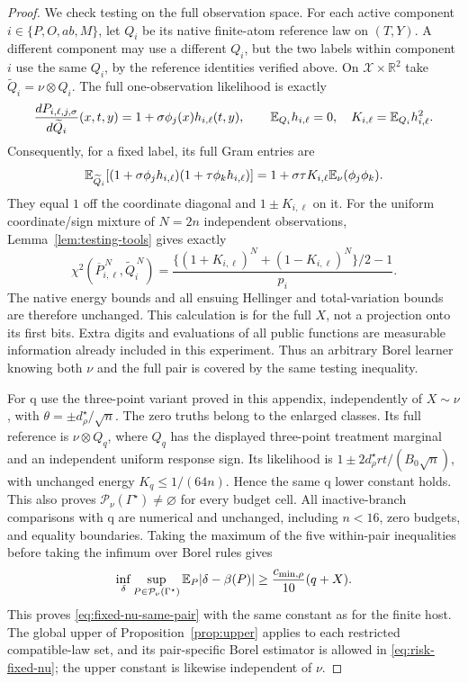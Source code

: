 \begin{proof}
We check testing on the full observation space.  For each active component
\(i\in\{P,O,ab,M\}\), let \(Q_i\) be its native finite-atom reference
law on \((T,Y)\).  A different component may use a different \(Q_i\), but
the two labels within component \(i\) use the same \(Q_i\), by the
reference identities verified above.  On
\(\mathcal X\times\mathbb R^2\) take
\(\widetilde Q_i=\nu\otimes Q_i\).  The full one-observation likelihood
is exactly
\[
 \frac{dP_{i,\ell,j,\sigma}}{d\widetilde Q_i}(x,t,y)
 =1+\sigma\phi_j(x)h_{i,\ell}(t,y),\qquad
 \mathbb E_{Q_i}h_{i,\ell}=0,\quad
 K_{i,\ell}=\mathbb E_{Q_i}h_{i,\ell}^2.
\]
Consequently, for a fixed label, its full Gram entries are
\[
 \mathbb E_{\widetilde Q_i}
 [(1+\sigma\phi_jh_{i,\ell})(1+\tau\phi_kh_{i,\ell})]
 =1+\sigma\tau K_{i,\ell}\mathbb E_\nu(\phi_j\phi_k).
\]
They equal \(1\) off the coordinate diagonal and \(1\pm K_{i,\ell}\)
on it.  For the uniform coordinate/sign mixture of \(N=2n\) independent
observations, Lemma~\ref{lem:testing-tools} gives exactly
\[
 \chi^2(\overline P_{i,\ell}^{\,N},\widetilde Q_i^{\,N})
 =\frac{\{(1+K_{i,\ell})^N+(1-K_{i,\ell})^N\}/2-1}{p_i}.
\]
The native energy bounds and all ensuing Hellinger and total-variation
bounds are therefore unchanged.  This calculation is for the full \(X\),
not a projection onto its first bits.  Extra digits and evaluations of all
public functions are measurable information already included in this
experiment.  Thus an arbitrary Borel learner knowing both \(\nu\) and the
full pair is covered by the same testing inequality.

For q use the three-point variant proved in this appendix, independently
of \(X\sim\nu\), with \(\theta=\pm d_\rho^\star/\sqrt n\).
The zero truths belong to the enlarged classes.  Its full reference is
\(\nu\otimes Q_q\), where \(Q_q\) has the displayed three-point
treatment marginal and an independent uniform response sign.  Its
likelihood is \(1\pm2d_\rho^\star rt/(B_0\sqrt n)\), with unchanged
energy \(K_q\le1/(64n)\).  Hence the same q lower constant holds.
This also proves \(\mathcal P_\nu(\Gamma^\star)\ne\varnothing\) for
every budget cell.  All inactive-branch comparisons with q are numerical
and unchanged, including \(n<16\), zero budgets, and equality boundaries.
Taking the maximum of the five within-pair inequalities before taking the
infimum over Borel rules gives
\[
 \inf_\delta\sup_{P\in\mathcal P_\nu(\Gamma^\star)}
 \mathbb E_P|\delta-\beta(P)|
 \ge\frac{c_{\min,\rho}}{10}(q+X).
\]
This proves \eqref{eq:fixed-nu-same-pair} with the same constant as for the
finite host.  The global upper of Proposition~\ref{prop:upper} applies to
each restricted compatible-law set, and its pair-specific Borel estimator
is allowed in \eqref{eq:risk-fixed-nu}; the upper constant is likewise
independent of \(\nu\).


\end{proof}
